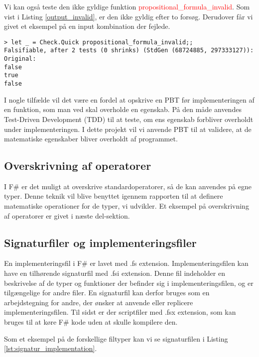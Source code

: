 Vi kan også teste den ikke gyldige funktion \textcolor{red}{propositional\_formula\_invalid}. Som vist i Listing \ref{output_invalid}, er den ikke gyldig efter to forsøg. Derudover får vi givet et eksempel på en input kombination der fejlede.

\begin{lstlisting}[style=output, label={output_invalid}, caption={Output ved PBT af \textcolor{red}{propositional\_formula\_invalid}}]
> let _ = Check.Quick propositional_formula_invalid;;
Falsifiable, after 2 tests (0 shrinks) (StdGen (68724885, 297333127)):
Original:
false
true
false
\end{lstlisting}

I nogle tilfælde vil det være en fordel at opskrive en PBT før implementeringen af en funktion, som man ved skal overholde en egenskab. På den måde anvendes Test-Driven Development (TDD) til at teste, om ens egenskab forbliver overholdt under implementeringen. I dette projekt vil vi anvende PBT til at validere, at de matematiske egenskaber bliver overholdt af programmet.



\subsection{Overskrivning af operatorer}
I F\# er det muligt at overskrive standardoperatorer, så de kan anvendes på egne typer. Denne teknik vil blive benyttet igennem rapporten til at definere matematiske operationer for de typer, vi udvikler. Et eksempel på overskrivning af operatorer er givet i næste del-sektion.

\subsection{Signaturfiler og implementeringsfiler}
En implementeringsfil i F\# er lavet med .fs extension. Implementeringsfilen kan have en tilhørende signaturfil med .fsi extension. Denne fil indeholder en beskrivelse af de typer og funktioner der befinder sig i implementeringsfilen, og er tilgængelige for andre filer. En signaturfil kan derfor bruges som en arbejdstegning for andre, der ønsker at anvende eller replicere implementeringsfilen. Til sidst er der scriptfiler med .fsx extension, som kan bruges til at køre F\# kode uden at skulle kompilere den.

Som et eksempel på de forskellige filtyper kan vi se signaturfilen i Listing \ref{lst:signatur_implementation}.
\newpage


